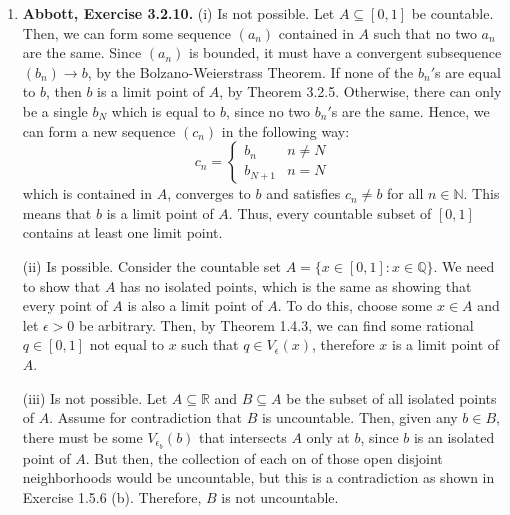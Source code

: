 \documentclass{article}
\newcommand{\N}{\mathbb{N}}
\newcommand{\Q}{\mathbb{Q}}
\newcommand{\R}{\mathbb{R}}
\newcommand{\ra}{\rightarrow}
\newcommand{\set}[1]{\{#1\}}
\newcommand{\exc}[2][Abbott]{\item \textbf{#1, Exercise #2.}}
\newcommand{\lep}[1][L]{#1et $\epsilon > 0$ be arbitrary}
\begin{document}
\begin{enumerate}
\begin{enumerate}
        \item For (i), let $\set{E_\lambda : \lambda \in \Lambda}$ be a finite collection of closed sets. Then, 
        \begin{equation*} 
            \left(\bigcup_{\lambda \in \Lambda} E_\lambda \right)^c =
            \bigcap_{\lambda \in \Lambda} E_\lambda^c,
        \end{equation*} but, by Theorem 3.2.13, each $E_\lambda^c$ is open, so a finite intersection of them is also open (Theorem 3.2.3), thus
        \begin{equation*}
            \bigcup_{\lambda \in \Lambda} E_\lambda
        \end{equation*} is closed, again by Theorem 3.2.13. A very similar proof follows for (ii).
    \end{enumerate}
    
    \exc{3.2.10}
    (i) Is not possible. Let $A \subseteq [0, 1]$ be countable. Then, we can form some sequence $(a_n)$ contained in $A$ such that no two $a_n$ are the same. Since $(a_n)$ is bounded, it must have a convergent subsequence $(b_n) \ra b$, by the Bolzano-Weierstrass Theorem. If none of the $b_n'$s are equal to $b$, then $b$ is a limit point of $A$, by Theorem 3.2.5. Otherwise, there can only be a single $b_N$ which is equal to $b$, since no two $b_n'$s are the same. Hence, we can form a new sequence $(c_n)$ in the following way:
    \begin{equation*}
        c_n = \begin{cases}
        b_n & n \neq N \\
        b_{N+1} & n = N
        \end{cases}
    \end{equation*} which is contained in $A$, converges to $b$ and satisfies $c_n \neq b$ for all $n \in \N$. This means that $b$ is a limit point of $A$. Thus, every countable subset of $[0, 1]$ contains at least one limit point.
    
    (ii) Is possible. Consider the countable set $A = \set{x \in [0, 1]: x \in \Q}$. We need to show that $A$ has no isolated points, which is the same as showing that every point of $A$ is also a limit point of $A$. To do this, choose some $x \in A$ and \lep[l]. Then, by Theorem 1.4.3, we can find some rational $q \in [0, 1]$ not equal to $x$ such that $q \in V_\epsilon(x)$, therefore $x$ is a limit point of $A$.
    
    (iii) Is not possible. Let $A \subseteq \R$ and $B \subseteq A$ be the subset of all isolated points of $A$. Assume for contradiction that $B$ is uncountable. Then, given any $b \in B$, there must be some $V_{\epsilon_b}(b)$ that intersects $A$ only at $b$, since $b$ is an isolated point of $A$. But then, the collection of each on of those open disjoint neighborhoods would be uncountable, but this is a contradiction as shown in Exercise 1.5.6 (b). Therefore, $B$ is not uncountable.
    

\end{enumerate}
\end{document}
